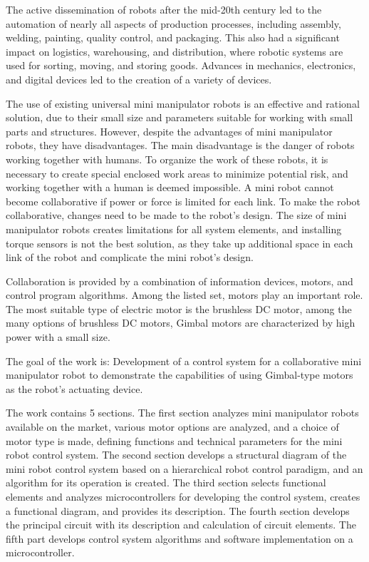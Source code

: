 

The active dissemination of robots after the mid-20th century led to the automation of nearly all aspects of production processes, including assembly, welding, painting, quality control, and packaging. This also had a significant impact on logistics, warehousing, and distribution, where robotic systems are used for sorting, moving, and storing goods. Advances in mechanics, electronics, and digital devices led to the creation of a variety of devices.

The use of existing universal mini manipulator robots is an effective and rational solution, due to their small size and parameters suitable for working with small parts and structures. However, despite the advantages of mini manipulator robots, they have disadvantages. The main disadvantage is the danger of robots working together with humans. To organize the work of these robots, it is necessary to create special enclosed work areas to minimize potential risk, and working together with a human is deemed impossible. A mini robot cannot become collaborative if power or force is limited for each link. To make the robot collaborative, changes need to be made to the robot's design. The size of mini manipulator robots creates limitations for all system elements, and installing torque sensors is not the best solution, as they take up additional space in each link of the robot and complicate the mini robot's design.

Collaboration is provided by a combination of information devices, motors, and control program algorithms. Among the listed set, motors play an important role. The most suitable type of electric motor is the brushless DC motor, among the many options of brushless DC motors, Gimbal motors are characterized by high power with a small size.

The goal of the work is: Development of a control system for a collaborative mini manipulator robot to demonstrate the capabilities of using Gimbal-type motors as the robot's actuating device.

The work contains 5 sections. The first section analyzes mini manipulator robots available on the market, various motor options are analyzed, and a choice of motor type is made, defining functions and technical parameters for the mini robot control system. The second section develops a structural diagram of the mini robot control system based on a hierarchical robot control paradigm, and an algorithm for its operation is created. The third section selects functional elements and analyzes microcontrollers for developing the control system, creates a functional diagram, and provides its description. The fourth section develops the principal circuit with its description and calculation of circuit elements. The fifth part develops control system algorithms and software implementation on a microcontroller.